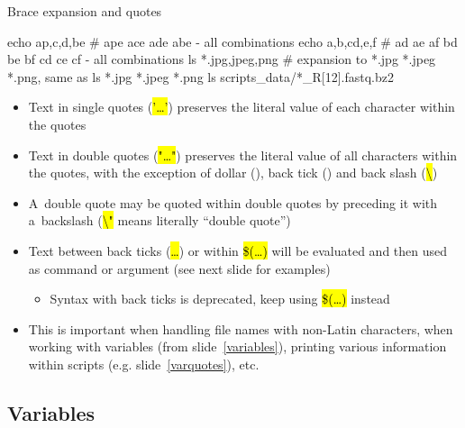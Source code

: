 \documentclass[compress, ucs, xelatex, 11pt, xcolor=svgnames, aspectratio=169,
	hyperref={
		bookmarks=true,
		unicode=true,
		colorlinks=true,
		pdftitle={Linux, command line and MetaCentrum},
		plainpages=false,
		pdfauthor={Vojtech Zeisek},
		pdfsubject={Course about use of Linux command line, writing shell scripts and using MetaCentrum of CESNET},
		pdfcreator={XeLaTeX},
		pdfkeywords={Linux, GNU, BASH, shell, command line, MetaCentrum},
		linkcolor=DarkRed, %
		anchorcolor=DarkBlue, %
		citecolor=Indigo, %
		filecolor=NavyBlue, %
		menucolor=DarkMagenta, %
		urlcolor=DarkBlue, %
		pdftex},
	url={hyphens, lowtilde} %
	]{beamer}
\renewcommand{\texttt}[1]{\hl{\ttfamily #1}}
\begin{document}
\begin{frame}[fragile]{Brace expansion and quotes}
	\begin{bashcode}
    echo a{p,c,d,b}e # ape ace ade abe - all combinations
    echo {a,b,c}{d,e,f} # ad ae af bd be bf cd ce cf - all combinations
    ls *.{jpg,jpeg,png} # expansion to *.jpg *.jpeg *.png, same as
    ls *.jpg *.jpeg *.png
    ls scripts_data/*_R[12].fastq.bz2
	\end{bashcode}
	\vfill
	\begin{itemize}
		\item Text in single quotes (\texttt{'\ldots'}) preserves the literal value of each character within the quotes
		\item Text in double quotes (\texttt{"\ldots"}) preserves the literal value of all characters within the quotes, with the exception of dollar (\texttt{\textdollar}), back tick (\texttt{\textasciigrave}) and back slash (\texttt{\textbackslash})
		\item A~double quote may be quoted within double quotes by preceding it with a~backslash (\texttt{\textbackslash"} means literally \enquote{double quote})
		\item Text between back ticks (\texttt{\textasciigrave\ldots\textasciigrave}) or within \texttt{\$(\ldots)} will be evaluated and then used as command or argument (see next slide for examples)
	\begin{itemize}
		\item Syntax with back ticks is deprecated, keep using \texttt{\$(\ldots)} instead
	\end{itemize}
	\item This is important when handling file names with non-Latin characters, when working with variables (from slide~\ref{variables}), printing various information within scripts (e.g. slide~\ref{varquotes}), etc.
	\end{itemize}
\end{frame}

\subsection{Variables}
\end{document}

